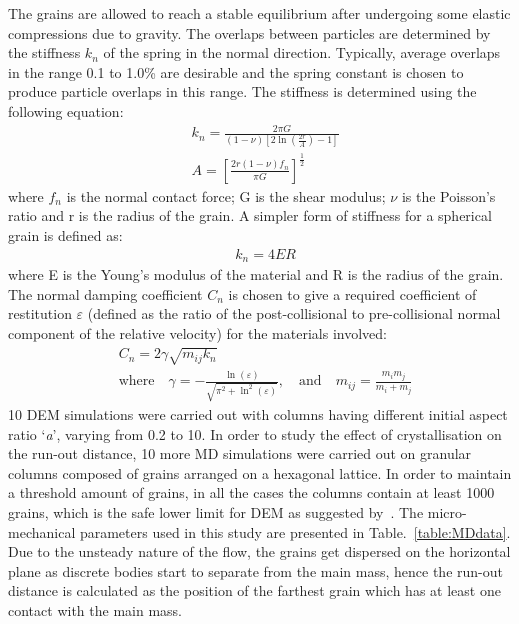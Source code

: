 The grains are allowed to reach a stable equilibrium after undergoing some 
elastic compressions due to gravity. 
The overlaps between particles are determined by the stiffness 
$\textit{k}_{\textit{n}}$ of the spring in the normal direction. Typically, 
average overlaps in the range 0.1 to 1.0\% are desirable and the spring 
constant is chosen to produce particle overlaps in this range. The stiffness is 
determined using the following equation:
\begin{align}
& \textit{k}_{\textit{n}}=\frac{2 \pi G}{(1-\nu)[2\ln(\frac{2r}{A})-1]} \\ 
& A = [\frac{2r(1-\nu)f_{n}}{\pi G}]^{\frac{1	}{2}}
\end{align}
where $f_{n}$ is the normal contact force; G is the shear modulus; $\nu$ is the 
Poisson's ratio and r is the radius of the grain. A simpler form of stiffness 
for a spherical grain is defined as:
\begin{align}
& \textit{k}_{\textit{n}}=4ER
\end{align}
where E is the Young's modulus of the material and R is the radius of the 
grain. The normal damping coefficient $C_{\textit{n}}$ is chosen to give a 
required coefficient of restitution $\varepsilon$ (defined as the ratio of the 
post-collisional to pre-collisional normal component of the relative velocity) 
for the materials involved:
\begin{align}
& C_{\textit{n}}=2\gamma \sqrt{m_{\textit{ij}}k_{\textit{n}}} \\ 
& \mbox{where} \quad \gamma = -\frac{\ln(\varepsilon)}{\sqrt{\pi^{2}+\ln^2 
(\varepsilon)}},\quad \mbox{and} \quad 
\textit{m}_{\textit{ij}}=\frac{\textit{m}_{\textit{i}}\textit{m}_{\textit{j}}}{\textit{m}_{\textit{i}}
 + \textit{m}_{\textit{j}}} 
\end{align}
10 DEM simulations were carried out with columns having 
different initial aspect ratio `\textit{a}', varying from 0.2 to 10. In order 
to study the effect of crystallisation on the run-out distance, 10 more MD 
simulations were carried out on granular columns composed of grains arranged on 
a hexagonal lattice. In order to maintain a threshold amount of grains, in all 
the cases the columns contain at least 1000 grains, which is the safe lower 
limit for DEM as suggested by~\citet{Oda1999}. The micro-mechanical parameters 
used in this study are presented in Table.~\ref{table:MDdata}. Due to the 
unsteady nature of the flow, the grains get dispersed on the horizontal plane 
as discrete bodies start to separate from the main mass, hence the run-out 
distance is calculated as the position of the farthest grain which has at least 
one contact with the main mass.

